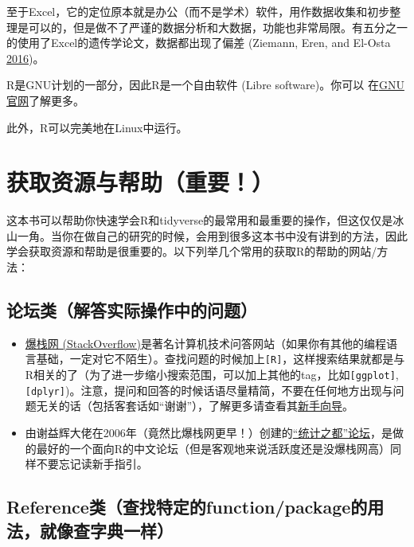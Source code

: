 \documentclass[]{book}
\providecommand{\tightlist}{%
  \setlength{\itemsep}{0pt}\setlength{\parskip}{0pt}}
\begin{document}
至于Excel，它的定位原本就是办公（而不是学术）软件，用作数据收集和初步整理是可以的，但是做不了严谨的数据分析和大数据，功能也非常局限。有五分之一的使用了Excel的遗传学论文，数据都出现了偏差 (Ziemann, Eren, and El-Osta \protect\hyperlink{ref-Ziemann2016Gene-name-errors}{2016})。

R是GNU计划的一部分，因此R是一个自由软件 (Libre software)。你可以 在\href{https://www.gnu.org/philosophy/free-sw.zh-cn.html}{GNU官网}了解更多。

此外，R可以完美地在Linux中运行。

\hypertarget{getting-help}{%
\chapter{获取资源与帮助（重要！）}\label{getting-help}}

这本书可以帮助你快速学会R和tidyverse的最常用和最重要的操作，但这仅仅是冰山一角。当你在做自己的研究的时候，会用到很多这本书中没有讲到的方法，因此学会获取资源和帮助是很重要的。以下列举几个常用的获取R的帮助的网站/方法：

\section{论坛类（解答实际操作中的问题）}

\begin{itemize}
\tightlist
\item
  \href{https://stackoverflow.com}{爆栈网 (StackOverflow)}是著名计算机技术问答网站（如果你有其他的编程语言基础，一定对它不陌生）。查找问题的时候加上\texttt{{[}R{]}}，这样搜索结果就都是与R相关的了（为了进一步缩小搜索范围，可以加上其他的tag，比如\texttt{{[}ggplot{]}}, \texttt{{[}dplyr{]}})。注意，提问和回答的时候话语尽量精简，不要在任何地方出现与问题无关的话（包括客套话如``谢谢''），了解更多请查看其\href{https://stackoverflow.com/tour}{新手向导}。
\item
  由谢益辉大佬在2006年（竟然比爆栈网更早！）创建的\href{https://d.cosx.org}{``统计之都''论坛}，是做的最好的一个面向R的中文论坛（但是客观地来说活跃度还是没爆栈网高）同样不要忘记读新手指引。
\end{itemize}

\hypertarget{referencefunctionpackage}{%
\section{Reference类（查找特定的function/package的用法，就像查字典一样）}\label{referencefunctionpackage}}
\end{document}
